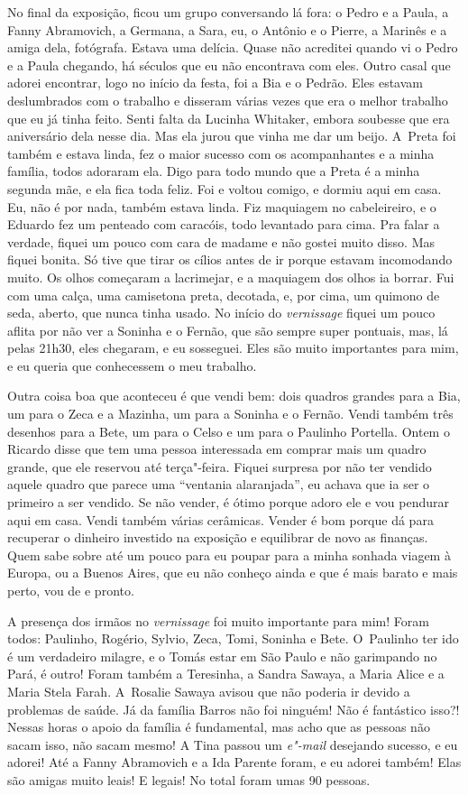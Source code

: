 No final da exposição, ficou um grupo conversando lá fora: o Pedro e a
Paula, a Fanny Abramovich, a Germana, a Sara, eu, o Antônio e o Pierre,
a Marinês e a amiga dela, fotógrafa. Estava uma delícia. Quase não
acreditei quando vi o Pedro e a Paula chegando, há séculos que eu não
encontrava com eles. Outro casal que adorei encontrar, logo no início da
festa, foi a Bia e o Pedrão. Eles estavam deslumbrados com o trabalho e
disseram várias vezes que era o melhor trabalho que eu já tinha feito.
Senti falta da Lucinha Whitaker, embora soubesse que era aniversário
dela nesse dia. Mas ela jurou que vinha me dar um beijo. A~Preta foi
também e estava linda, fez o maior sucesso com os acompanhantes e a
minha família, todos adoraram ela. Digo para todo mundo que a Preta é a
minha segunda mãe, e ela fica toda feliz. Foi e voltou comigo, e dormiu
aqui em casa. Eu, não é por nada, também estava linda. Fiz maquiagem no
cabeleireiro, e o Eduardo fez um penteado com caracóis, todo levantado
para cima. Pra falar a verdade, fiquei um pouco com cara de madame e não
gostei muito disso. Mas fiquei bonita. Só tive que tirar os cílios antes
de ir porque estavam incomodando muito. Os olhos começaram a lacrimejar,
e a maquiagem dos olhos ia borrar. Fui com uma calça, uma camisetona
preta, decotada, e, por cima, um quimono de seda, aberto, que nunca
tinha usado. No início do \emph{vernissage} fiquei um pouco aflita por
não ver a Soninha e o Fernão, que são sempre super pontuais, mas, lá
pelas 21h30, eles chegaram, e eu sosseguei. Eles são muito importantes
para mim, e eu queria que conhecessem o meu trabalho.

Outra coisa boa que aconteceu é que vendi bem: dois quadros grandes para
a Bia, um para o Zeca e a Mazinha, um para a Soninha e o Fernão. Vendi
também três desenhos para a Bete, um para o Celso e um para o Paulinho
Portella. Ontem o Ricardo disse que tem uma pessoa interessada em
comprar mais um quadro grande, que ele reservou até terça"-feira. Fiquei
surpresa por não ter vendido aquele quadro que parece uma ``ventania
alaranjada'', eu achava que ia ser o primeiro a ser vendido. Se não
vender, é ótimo porque adoro ele e vou pendurar aqui em casa. Vendi
também várias cerâmicas. Vender é bom porque dá para recuperar o
dinheiro investido na exposição e equilibrar de novo as finanças. Quem
sabe sobre até um pouco para eu poupar para a minha sonhada viagem à
Europa, ou a Buenos Aires, que eu não conheço ainda e que é mais barato
e mais perto, vou de  e pronto.

A presença dos irmãos no \emph{vernissage} foi muito importante para
mim! Foram todos: Paulinho, Rogério, Sylvio, Zeca, Tomi, Soninha e Bete.
O~Paulinho ter ido é um verdadeiro milagre, e o Tomás estar em São Paulo
e não garimpando no Pará, é outro! Foram também a Teresinha, a Sandra
Sawaya, a Maria Alice e a Maria Stela Farah. A~Rosalie Sawaya avisou que
não poderia ir devido a problemas de saúde. Já da família Barros não foi
ninguém! Não é fantástico isso?! Nessas horas o apoio da família é
fundamental, mas acho que as pessoas não sacam isso, não sacam mesmo! A
Tina passou um \emph{e"-mail} desejando sucesso, e eu adorei! Até a Fanny
Abramovich e a Ida Parente foram, e eu adorei também! Elas são amigas
muito leais! E legais! No total foram umas 90 pessoas.

